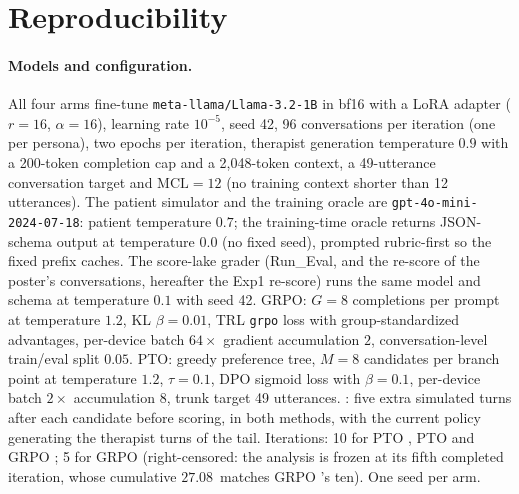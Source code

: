 \section{Reproducibility}
\label{app:repro}

\paragraph{Models and configuration.} All four arms fine-tune \texttt{meta-llama/Llama-3.2-1B}
in bf16 with a LoRA adapter ($r{=}16$, $\alpha{=}16$), learning rate $10^{-5}$, seed 42, 96
conversations per iteration (one per persona), two epochs per iteration, therapist generation
temperature $0.9$ with a 200-token completion cap and a 2{,}048-token context, a 49-utterance
conversation target and $\mathrm{MCL}{=}12$ (no training context shorter than 12 utterances).
The patient simulator and the training oracle are \texttt{gpt-4o-mini-2024-07-18}: patient
temperature $0.7$; the training-time oracle returns JSON-schema output at temperature $0.0$ (no
fixed seed), prompted rubric-first so the fixed prefix caches. The score-lake grader
(Run\_Eval, and the re-score of the poster's conversations, hereafter the Exp1 re-score) runs the
same model and schema at temperature $0.1$ with seed 42. GRPO: $G{=}8$ completions per prompt at temperature $1.2$, KL
$\beta{=}0.01$, TRL \texttt{grpo} loss with group-standardized advantages, per-device batch
$64 \times$ gradient accumulation $2$, conversation-level train/eval split $0.05$. PTO: greedy
preference tree, $M{=}8$ candidates per branch point at temperature $1.2$, $\tau{=}0.1$, DPO
sigmoid loss with $\beta{=}0.1$, per-device batch $2 \times$ accumulation $8$, trunk target 49
utterances. \Kf{}: five extra simulated turns after each candidate before scoring, in both methods,
with the current policy generating the therapist turns of the tail. Iterations: 10 for PTO \Kz{},
PTO \Kf{} and GRPO \Kz{}; 5 for GRPO \Kf{} (right-censored: the analysis is frozen at its fifth
completed iteration, whose cumulative $27.08$\,\gpuh{} matches GRPO \Kz{}'s ten). One seed per
arm.

